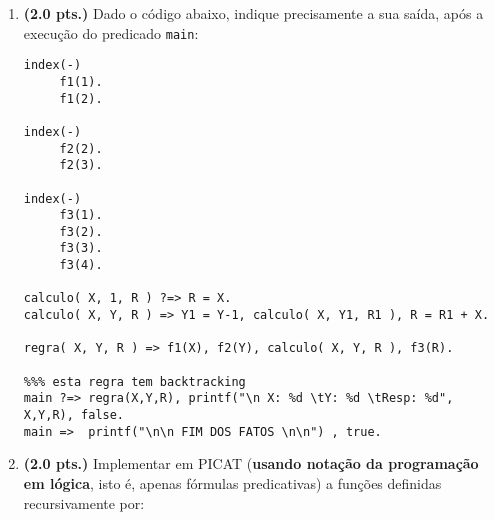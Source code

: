 \documentclass[11pt, a4paper,final]{article}
\begin{document}
\begin{enumerate}
\begin{comment}
\begin{enumerate}
\itemsep -2pt
\item $\forall x \exists y:~ \:\: p(x,y) $
\item $\forall x \forall y:~ \:\: p(x,y) $
\item $\exists x \forall y:~ \:\: p(x,y) $
\item $\exists y:~ \:\: \sim p(a,y) $
\item $\forall x \forall y:~ \:\: (p(x,y) \rightarrow p(y,x)) $
\item $\forall x:~  \:\: p(x,x) $
\end{enumerate}

\newpage
\end{comment}

  

\item {\bf (2.0 pts.)} Dado o código abaixo, indique precisamente a sua saída, após   a execução do predicado \texttt{main}:

\begin{tiny}
\begin{verbatim}
index(-)      
     f1(1).
     f1(2).
	
index(-)  
     f2(2).
     f2(3).
	
index(-) 
     f3(1).
     f3(2).
     f3(3).
     f3(4).
    
calculo( X, 1, R ) ?=> R = X.
calculo( X, Y, R ) => Y1 = Y-1, calculo( X, Y1, R1 ), R = R1 + X.

regra( X, Y, R ) => f1(X), f2(Y), calculo( X, Y, R ), f3(R).

%%% esta regra tem backtracking
main ?=> regra(X,Y,R), printf("\n X: %d \tY: %d \tResp: %d", X,Y,R), false.
main =>  printf("\n\n FIM DOS FATOS \n\n") , true.
\end{verbatim}
\end{tiny}



\newpage
\item {\bf (2.0 pts.)} Implementar em PICAT (\textbf{usando notação da programação em lógica}, isto é, apenas fórmulas predicativas) a funções definidas recursivamente por:


\end{enumerate}
\end{document}
